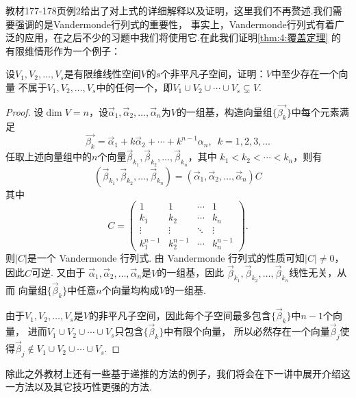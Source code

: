 教材177-178页例2给出了对上式的详细解释以及证明，这里我们不再赘述.我们需要强调的是Vandermonde行列式的重要性，
事实上，Vandermonde行列式有着广泛的应用，在之后不少的习题中我们将使用它.在此我们证明\autoref{thm:4:覆盖定理}
的有限维情形作为一个例子：
\begin{example}\label{ex:13:行列式证明覆盖定理}
    设$V_1,V_2,\ldots,V_s$是有限维线性空间$V$的$s$个非平凡子空间，证明：$V$中至少存在一个向量
    不属于$V_1,V_2,\ldots,V_s$中的任何一个，即$V_1 \cup V_2 \cup \cdots \cup V_s\subsetneq V.$
\end{example}
\begin{proof}
    设$\dim V=n$，设$\vec{\alpha}_1,\vec{\alpha}_2,\ldots,\vec{\alpha}_n$为$V$的一组基，构造向量组$\{\vec{\beta_k}\}$中每个元素满足
    \[\vec{\beta_k}=\vec{\alpha}_1+k\vec{\alpha}_2+\cdots+k^{n-1}\alpha_n,\enspace k=1,2,3,\ldots\]
    任取上述向量组中的$n$个向量$\vec{\beta}_{k_1},\vec{\beta}_{k_2},\ldots,\vec{\beta}_{k_n}$，其中
    $k_1<k_2<\cdots<k_n$，则有
    \[(\vec{\beta}_{k_1},\vec{\beta}_{k_2},\ldots,\vec{\beta}_{k_n})=(\vec{\alpha}_1,\vec{\alpha}_2,\ldots,\vec{\alpha}_n)C\]
    其中
    \[C=\begin{pmatrix}
        1 & 1 & \cdots & 1 \\
        k_1 & k_2 & \cdots & k_n \\
        \vdots & \vdots & \ddots & \vdots \\
        k_1^{n-1} & k_2^{n-1} & \cdots & k_n^{n-1}
    \end{pmatrix}.\]
    则$|C|$是一个 Vandermonde 行列式. 由 Vandermonde 行列式的性质可知$|C| \neq 0$，因此$C$可逆. 又由于
    $\vec{\alpha}_1,\vec{\alpha}_2,\ldots,\vec{\alpha}_n$是$V$的一组基，因此
    $\vec{\beta}_{k_1},\vec{\beta}_{k_2},\ldots,\vec{\beta}_{k_n}$线性无关，从而
    向量组$\{\vec{\beta}_k\}$中任意$n$个向量均构成$V$的一组基.

    由于$V_1,V_2,\ldots,V_s$是$V$的非平凡子空间，因此每个子空间最多包含$\{\vec{\beta}_k\}$中$n-1$个向量，
    进而$V_1\cup V_2\cup\cdots\cup V_s$只包含$\{\vec{\beta}_k\}$中有限个向量，
    所以必然存在一个向量$\vec{\beta}_j$使得$\vec{\beta}_j \notin V_1\cup V_2\cup\cdots\cup V_s$.
\end{proof}

除此之外教材上还有一些基于递推的方法的例子，我们将会在下一讲中展开介绍这一方法以及其它技巧性更强的方法.

